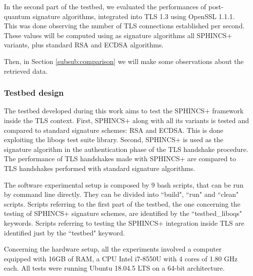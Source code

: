 \documentclass[a4paper,12pt]{article}
\def\eg{e.g.\xspace}
\def\mytab#1{Tab.~#1\xspace}
\begin{document}
In the second part of the testbed, we evaluated the performances of post-quantum signature algorithms, integrated into TLS 1.3 using OpenSSL 1.1.1. This was done observing the number of TLS connections established per second. These values will be computed using as signature algorithms all SPHINCS+ variants, plus standard RSA and ECDSA algorithms. 

Then, in Section \ref{subsub:comparison}
we will make some observations about the retrieved data.

\subsubsection{Testbed design}

The testbed developed during this work aims to test the SPHINCS+ framework inside the TLS context.
First, SPHINCS+ along with all its variants is tested and compared to standard signature schemes: RSA and ECDSA. This is done exploiting the liboqs test suite library.
Second, SPHINCS+ is used as the signature algorithm in the authentication phase of the TLS handshake procedure. The performance of TLS handshakes made with SPHINCS+ are compared to TLS handshakes performed with standard signature algorithms.

The software experimental setup is composed by 9 bash scripts, that can be run by command line directly. They can be divided into ``build", ``run" and ``clean" scripts. Scripts referring to the first part of the testbed, the one concerning the testing of SPHINCS+ signature schemes, are identified by the ``testbed\_liboqs" keywords. Scripts referring to testing the SPHINCS+ integration inside TLS are identified just by the ``testbed" keyword.

Concerning the hardware setup, all the experiments involved a computer equipped with 16GB of RAM, a CPU Intel i7-8550U with 4 cores of 1.80 GHz each. All tests were running Ubuntu 18.04.5 LTS on a 64-bit architecture.

\end{document}
